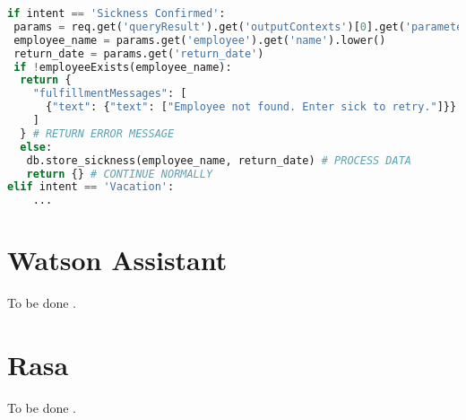 \begin{lstlisting}[caption={Dialogflow Intent Handling}, label={lst:dialogflow_intent_handling},captionpos=b,frame=single,language={Python},commentstyle=\color{mygreen},keywordstyle=\color{blue},
    morekeywords={}]                
if intent == 'Sickness Confirmed':
 params = req.get('queryResult').get('outputContexts')[0].get('parameters')
 employee_name = params.get('employee').get('name').lower()
 return_date = params.get('return_date')
 if !employeeExists(employee_name):
  return {
    "fulfillmentMessages": [
      {"text": {"text": ["Employee not found. Enter sick to retry."]}}
    ]
  } # RETURN ERROR MESSAGE
  else:
   db.store_sickness(employee_name, return_date) # PROCESS DATA
   return {} # CONTINUE NORMALLY
elif intent == 'Vacation':
    ...
\end{lstlisting}  

\section{Watson Assistant}
To be done \cite{watsonassistant}.
 
\section{Rasa}
To be done \cite{rasa}.

